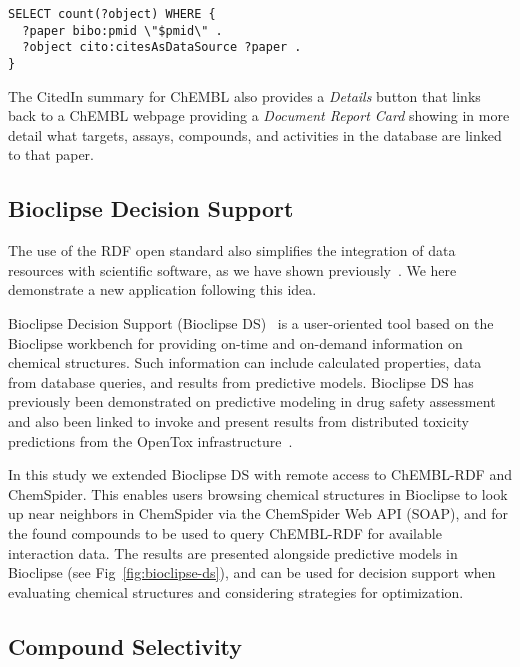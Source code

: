 \documentclass[10pt]{bmc_article}
\newenvironment{bmcformat}{\begin{raggedright}\baselineskip20pt\sloppy\setboolean{publ}{false}}{\end{raggedright}\baselineskip20pt\sloppy}
\begin{document}
\begin{bmcformat}
\begin{small}
\begin{verbatim}
SELECT count(?object) WHERE {
  ?paper bibo:pmid \"$pmid\" .
  ?object cito:citesAsDataSource ?paper .
}
\end{verbatim}
\end{small}

The CitedIn summary for ChEMBL also provides a \textit{Details} button that links back to a ChEMBL webpage providing
a \textit{Document Report Card} showing in more detail what targets, assays, compounds, and activities in the database
are linked to that paper.

\subsection*{Bioclipse Decision Support}

The use of the RDF open standard also simplifies the integration of data resources with 
scientific software, as we have shown previously~\cite{Willighagen2011,Willighagen:2011kx}.
We here demonstrate a new application following this idea.

Bioclipse Decision Support (Bioclipse DS)~\cite{Spjuth:2011uq} is a user-oriented tool based on the Bioclipse 
workbench for providing on-time and on-demand information on chemical structures. 
Such information can include calculated properties, data from database queries, 
and results from predictive models. Bioclipse DS has previously been demonstrated on predictive 
modeling in drug safety assessment~\cite{Spjuth:2011uq} and also been linked to invoke and 
present results from distributed toxicity predictions from the OpenTox infrastructure~\cite{Willighagen:2011kx}.

In this study we extended Bioclipse DS with remote access to ChEMBL-RDF and ChemSpider. 
This enables users browsing chemical structures in Bioclipse to look up near neighbors in ChemSpider 
via the ChemSpider Web API (SOAP), and for the found compounds to be used to query ChEMBL-RDF for 
available interaction data. The results are presented alongside predictive models in Bioclipse
(see Fig~\ref{fig:bioclipse-ds}), and can be used for decision support when evaluating chemical
structures and considering strategies for optimization.

\subsection*{Compound Selectivity}


\end{bmcformat}
\end{document}
